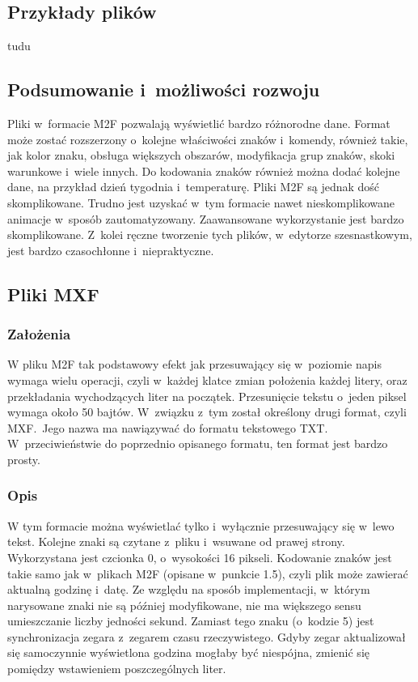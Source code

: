 \subsection{Przykłady plików}
tudu

\subsection{Podsumowanie i~możliwości rozwoju}
Pliki w~formacie M2F pozwalają wyświetlić bardzo różnorodne dane. Format może zostać rozszerzony o~kolejne właściwości znaków i~komendy, również takie, jak kolor znaku, obsługa większych obszarów, modyfikacja grup znaków, skoki warunkowe i~wiele innych. Do kodowania znaków również można dodać kolejne dane, na przykład dzień tygodnia i~temperaturę. Pliki M2F są jednak dość skomplikowane. Trudno jest uzyskać w~tym formacie nawet nieskomplikowane animacje w~sposób zautomatyzowany. Zaawansowane wykorzystanie jest bardzo skomplikowane. Z~kolei ręczne tworzenie tych plików, w~edytorze szesnastkowym, jest bardzo czasochłonne i~niepraktyczne. 
\subsection{Pliki MXF}
\subsubsection{Założenia}
W pliku M2F tak podstawowy efekt jak przesuwający się w~poziomie napis wymaga wielu operacji, czyli w~każdej klatce zmian położenia każdej litery, oraz przekładania wychodzących liter na początek. Przesunięcie tekstu o~jeden piksel wymaga około 50 bajtów. W~związku z~tym został określony drugi format, czyli MXF.~Jego nazwa ma nawiązywać do formatu tekstowego TXT. W~przeciwieństwie do poprzednio opisanego formatu, ten format jest bardzo prosty.

\subsubsection{Opis}
W tym formacie można wyświetlać tylko i~wyłącznie przesuwający się w~lewo tekst. Kolejne znaki są czytane z~pliku i~wsuwane od prawej strony. Wykorzystana jest czcionka 0, o~wysokości 16 pikseli. Kodowanie znaków jest takie samo jak w~plikach M2F (opisane w~punkcie 1.5), czyli plik może zawierać aktualną godzinę i~datę. Ze względu na sposób implementacji, w~którym narysowane znaki nie są później modyfikowane, nie ma większego sensu umieszczanie liczby jedności sekund. Zamiast tego znaku (o~kodzie 5) jest synchronizacja zegara z~zegarem czasu rzeczywistego. Gdyby zegar aktualizował się samoczynnie wyświetlona godzina mogłaby być niespójna, zmienić się pomiędzy wstawieniem poszczególnych liter.
